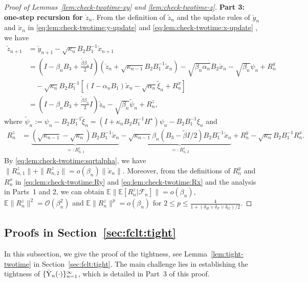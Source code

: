 \documentclass[11pt]{article}
\theoremstyle{plain}
\theoremstyle{definition}
\def\Hsmooth{{\delta_H}}
\def\Fsmooth{{\delta_F}}
\def\Gsmooth{{\delta_G}}
\def\invdiffslow{\tilde{\beta}}
\def\mI{{\bm{I}}}
\def\FM{{\mathcal F}}
\def\OM{{\mathcal O}}
\def\EB{{\mathbb E}}
\newcommand{\xcheck}{{\check{x}}}
\newcommand{\ycheck}{{\check{y}}}
\newcommand{\zcheck}{{\check{z}}}
\newcommand{\ybar}{{\bar{\textnormal{Y}}}}
\def\mI{{I}}
\begin{document}
\begin{appendix}
\begin{proof}[Proof of Lemmas~\ref{lem:check-twotime-xy} and \ref{lem:check-twotime-z}]
\textbf{Part 3: one-step recursion for $\zcheck_{n}$}.
From the definition of $\zcheck_{n}$ and the update rules of $\ycheck_{n}$ and $\xcheck_{n}$ in \eqref{eq:lem:check-twotime:y-update} and \eqref{eq:lem:check-twotime:x-update} , we have
\begin{align*}
    \zcheck_{n+1}
    & = \ycheck_{n+1} - \sqrt{\kappa_{n}} B_2 B_1^{-1} \xcheck_{n+1} \\
    & = \left( \mI - \beta_{n} B_3 + \frac{\invdiffslow \beta_{n}}{2} \mI \right) (\zcheck_{n} + \sqrt{\kappa_{n-1}} B_2 B_1^{-1} \xcheck_{n})
    - \sqrt{ \beta_{n} \alpha_{n} } B_2 \xcheck_{n} - \sqrt{ \beta_{n} } \psi_{n} + R_{n}^y \\
    & \quad - \sqrt{\kappa_{n}} B_2 B_1^{-1} \left[ (\mI - \alpha_{n} B_1 ) \xcheck_{n} - \sqrt{\alpha_{n}} \tilde{\xi}_{n} + R_{n}^x \right] \\
    & = \left( \mI - \beta_{n} B_3 + \frac{\invdiffslow \beta_{n}}{2} \mI \right) \zcheck_{n} - \sqrt{\beta_{n}} \tilde{\psi}_{n} + R_{n}^z,
\end{align*}
where $\tilde{\psi}_{n} := \psi_{n} - B_2 B_1^{-1} \tilde{\xi}_n = (\mI + \kappa_{n} B_2 B_1^{-1} H^\star) \psi_{n} - B_2 B_1^{-1} \xi_{n}$ and
\begin{align*}
    R_{n}^z
    & = \underbrace{ (\sqrt{\kappa_{n-1}} {-} \sqrt{\kappa_{n}}) B_2 B_1^{-1} \xcheck_{n} }_{=: R_{n,1}^z} 
    - \underbrace{ \sqrt{\kappa_{n-1}} \beta_{n} (B_3 {-} \invdiffslow \mI / 2) B_2 B_1^{-1} \xcheck_{n} }_{=: R_{n,2}^z}
    + R_{n}^{y} - \sqrt{\kappa_{n}} B_2 B_1^{-1} R_{n}^x.
\end{align*}
By \eqref{eq:lem:check-twotime:sqrtalpha}, we have $\| R_{n,1}^z \| + \| R_{n,2}^z \| = o(\beta_{n}) \| \xcheck_{n} \|$.
Moreover, from the definitions of $R_{n}^y$ and $R_{n}^x$ in \eqref{eq:lem:check-twotime:Ry} and \eqref{eq:lem:check-twotime:Rx} and the analysis in Parts~1 and 2, we can obtain
$\EB \| \EB [ R_{n}^z | \FM_{n} ] \| = o(\beta_{n}) $, $\EB \| R_{n}^z \|^2 = \OM (\beta_{n}^2)$ and $\EB \| R_{n}^z \|^p = o(\beta_{n})$ for $2 \le p \le \frac{4}{1 + ( \Hsmooth \vee \Fsmooth \vee \Gsmooth )/2}$.
\end{proof}



\subsection{Proofs in Section~\ref{sec:fclt:tight}}
\label{sec:fclt:proof:tight}
In this subsection, we give the proof of the tightness, see Lemma~\ref{lem:tight-twotime} in Section~\ref{sec:fclt:tight}.
The main challenge lies in establishing the tightness of $\{ \ybar_{n}(\cdot) \}_{n=1}^\infty$, which is detailed in Part~3 of this proof.


\end{appendix}
\end{document}
